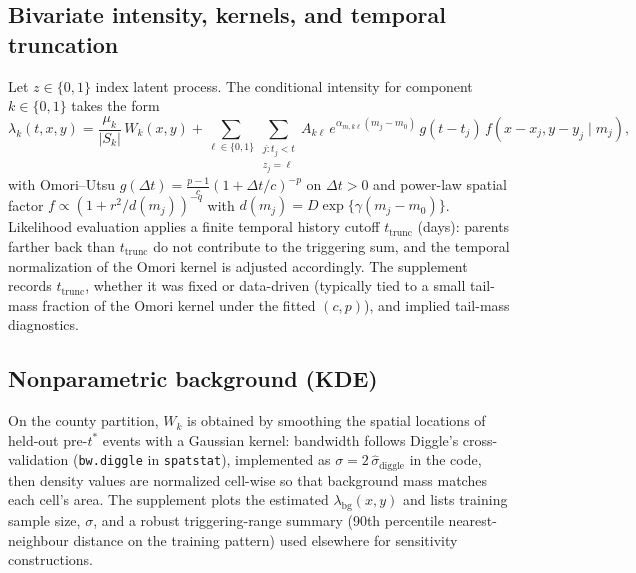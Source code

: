 \documentclass{statsoc}
\newcommand{\1}{\mathbbm{1}}
\begin{document}
\subsection{Bivariate intensity, kernels, and temporal truncation}\label{sec:ok_etas_spec}
Let $z\in\{0,1\}$ index latent process. The conditional intensity for component $k\in\{0,1\}$ takes the form
\[
\lambda_k(t,x,y)
  = \frac{\mu_k}{|S_k|}\, W_k(x,y)
  + \sum_{\ell \in \{0,1\}} \sum_{\substack{j : t_j < t \\ z_j = \ell}}
    A_{k\ell}\, e^{\alpha_{m,k\ell}(m_j - m_0)}\,
    g(t - t_j)\, f(x-x_j, y-y_j \mid m_j),
\]
with Omori--Utsu $g(\Delta t)=\frac{p-1}{c}(1+\Delta t/c)^{-p}$ on $\Delta t>0$ and power-law spatial factor $f \propto (1+r^2/d(m_j))^{-q}$ with $d(m_j)=D\exp\{\gamma(m_j-m_0)\}$. Likelihood evaluation applies a finite temporal history cutoff $t_{\mathrm{trunc}}$ (days): parents farther back than $t_{\mathrm{trunc}}$ do not contribute to the triggering sum, and the temporal normalization of the Omori kernel is adjusted accordingly. The supplement records $t_{\mathrm{trunc}}$, whether it was fixed or data-driven (typically tied to a small tail-mass fraction of the Omori kernel under the fitted $(c,p)$), and implied tail-mass diagnostics.

\subsection{Nonparametric background (KDE)}\label{sec:ok_kde}
On the county partition, $W_k$ is obtained by smoothing the spatial locations of held-out pre-$t^\ast$ events with a Gaussian kernel: bandwidth follows Diggle's cross-validation (\verb|bw.diggle| in \texttt{spatstat}), implemented as $\sigma = 2\,\hat\sigma_{\mathrm{diggle}}$ in the code, then density values are normalized cell-wise so that background mass matches each cell's area. The supplement plots the estimated $\lambda_{\mathrm{bg}}(x,y)$ and lists training sample size, $\sigma$, and a robust triggering-range summary (90th percentile nearest-neighbour distance on the training pattern) used elsewhere for sensitivity constructions.
\end{document}
